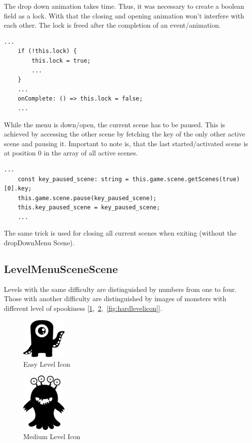 The drop down animation takes time. Thus, it was necessary to create a boolean field as a lock.
With that the closing and opening animation won't interfere with each other.
The lock is freed after the completion of an event/animation.

\begin{lstlisting}[style=TypeScript, caption={Lock acquiring and freeing}]
    ...
    if (!this.lock) {
        this.lock = true;
        ...
    }
    ...
    onComplete: () => this.lock = false;
    ...
\end{lstlisting}

While the menu is down/open, the current scene has to be paused.
This is achieved by accessing the other scene by fetching the key of the only other active scene and pausing it.
Important to note is, that the last started/activated scene is at position 0 in the array of all active scenes.
\begin{lstlisting}[style=TypeScript, caption={Fetching current active scene}]
    ...
    const key_paused_scene: string = this.game.scene.getScenes(true)[0].key;
    this.game.scene.pause(key_paused_scene);
    this.key_paused_scene = key_paused_scene;
    ...
\end{lstlisting}

The same trick is used for closing all current scenes when exiting (without the dropDownMenu Scene).

\subsection{LevelMenuSceneScene}\label{subsec:levelmenuscenescene}
Levels with the same difficulty are distinguished by numbers from one to four.
Those with another difficulty are distinguished by images of monsters with different level of spookiness
[\ref{fig:easylevelicon},\ \ref{fig:mediumlevelicon},\ \ref{fig:hardlevelicon}].

\begin{figure}[H]
    \centering
    \includegraphics[width=0.2\textwidth]{figures/easylevelicon}
    \caption{Easy Level Icon}
    \label{fig:easylevelicon}
\end{figure}

\begin{figure}[H]
    \centering
    \includegraphics[width=0.2\textwidth]{figures/mediumlevelicon}
    \caption{Medium Level Icon}
    \label{fig:mediumlevelicon}
\end{figure}

